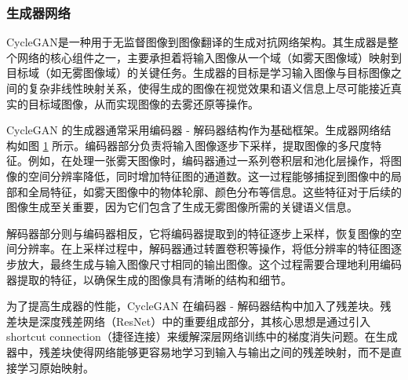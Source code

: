 \subsubsection{生成器网络}


CycleGAN是一种用于无监督图像到图像翻译的生成对抗网络架构。其生成器是整个网络的核心组件之一，主要承担着将输入图像从一个域（如雾天图像域）映射到目标域（如无雾图像域）的关键任务。生成器的目标是学习输入图像与目标图像之间的复杂非线性映射关系，使得生成的图像在视觉效果和语义信息上尽可能接近真实的目标域图像，从而实现图像的去雾还原等操作。

CycleGAN 的生成器通常采用编码器 - 解码器结构作为基础框架。生成器网络结构如图 \ref{fig:gnet} 所示。编码器部分负责将输入图像逐步下采样，提取图像的多尺度特征。例如，在处理一张雾天图像时，编码器通过一系列卷积层和池化层操作，将图像的空间分辨率降低，同时增加特征图的通道数。这一过程能够捕捉到图像中的局部和全局特征，如雾天图像中的物体轮廓、颜色分布等信息。这些特征对于后续的图像生成至关重要，因为它们包含了生成无雾图像所需的关键语义信息。

解码器部分则与编码器相反，它将编码器提取到的特征逐步上采样，恢复图像的空间分辨率。在上采样过程中，解码器通过转置卷积等操作，将低分辨率的特征图逐步放大，最终生成与输入图像尺寸相同的输出图像。这个过程需要合理地利用编码器提取的特征，以确保生成的图像具有清晰的结构和细节。

\begin{figure}[htb]
    \centering
    \captionsetup{font=footnotesize}
    \label{fig:gnet}
\end{figure}


为了提高生成器的性能，CycleGAN 在编码器 - 解码器结构中加入了残差块。残差块是深度残差网络（ResNet）中的重要组成部分，其核心思想是通过引入 shortcut connection（捷径连接）来缓解深层网络训练中的梯度消失问题。在生成器中，残差块使得网络能够更容易地学习到输入与输出之间的残差映射，而不是直接学习原始映射。

